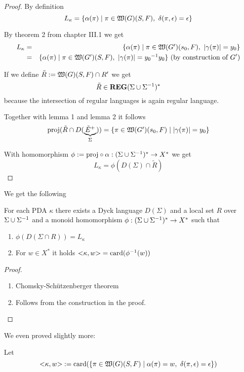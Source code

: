 \begin{proof}
By definition
\[ L_\kappa = \mbox{$\{\alpha(\pi) \mid \pi \in \mbox{$\mathfrak{W}({G})$}(S, F),\ \delta(\pi,
\epsilon) = \epsilon\}$} \]

By theorem 2 from chapter III.1 we get
\begin{eqnarray*}
L_\kappa &=& \mbox{$\{\alpha(\pi) \mid \pi \in \mbox{$\mathfrak{W}({G'})$}(s_0, F),\
|\gamma(\pi)| = y_0\}$} \\
&=& \mbox{$\{\alpha(\pi) \mid \pi \in \mbox{$\mathfrak{W}({G'})$}(S, F),\
|\gamma(\pi)| = \mbox{${y_0}^{-1}$} y_0\}$}\text{ (by construction of $G'$)}
\end{eqnarray*}

If we define $\tilde{R} := \mbox{$\mathfrak{W}({G})$}(S, F) \cap R'$ we get
\[ \tilde{R} \in \mbox{{\bf REG}}(\Sigma \cup {\Sigma}^{-1})^* \]
because the intersection of regular languages is again regular language.

\medskip
Together with lemma 1 and lemma 2 it follows
\[ \mathrm{proj}({\tilde{R} \cap D(\underbrace{\tilde{E}^+}_{\Sigma})}) = \mbox{$\{\pi \in
\mbox{$\mathfrak{W}({G'})$}(s_0, F) \mid |\gamma(\pi)| = y_0\}$} \]

With homomorphism $\phi := \mathrm{proj} \circ \alpha : (\Sigma \cup {\Sigma}^{-1})^*
\to X^*$ we get
\[ L_\kappa = \phi(D(\Sigma) \cap \tilde{R}) \]
\end{proof}

\bigskip
We get the following
\begin{corollary}
For each PDA $\kappa$ there exists a Dyck language $D(\Sigma)$ and a local set
$R$ over $\Sigma \cup {\Sigma}^{-1}$ and a monoid homomorphism $\phi:
(\Sigma \cup {\Sigma}^{-1})^* \to X^*$ such that
\begin{enumerate}
  \item $\phi(D(\Sigma\cap R)) = L_\kappa$
  \item For $w\in X^*$ it holds ${<}\kappa, w{>} = \mathrm{card}({\phi^{-1}(w)})$
\end{enumerate}
\end{corollary}

\begin{proof}\ 

\begin{enumerate}
  \item Chomsky-Schützenberger theorem
  \item Follows from the construction in the proof.
\end{enumerate}
\end{proof}

We even proved slightly more:

Let \[ {<}\kappa, w{>} := \mathrm{card}({\mbox{$\{\pi \in \mbox{$\mathfrak{W}({G})$}(S,F) \mid \alpha(\pi)
= w,\ \delta(\pi, \epsilon) = \epsilon\}$}}) \]

